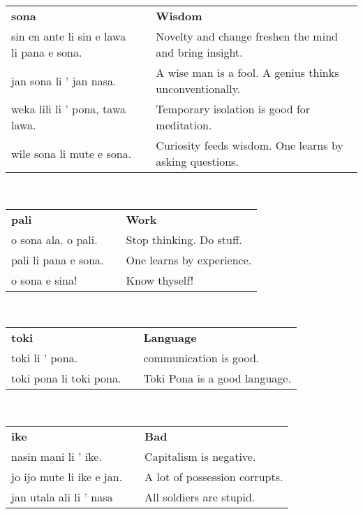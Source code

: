%
\begin{supertabular}{p{6cm}|ll}
    \textbf{sona}                             &  & \textbf{Wisdom}                                         \\
    sin en ante li sin e lawa li pana e sona. &  & Novelty and change freshen the mind and bring insight.  \\
    jan sona li ' jan nasa.                   &  & A wise man is a fool. A genius thinks unconventionally. \\
    weka lili li ' pona, tawa lawa.           &  & Temporary isolation is good for meditation.             \\
    wile sona li mute e sona.                 &  & Curiosity feeds wisdom. One learns by asking questions. \\
\end{supertabular} \\
%
\begin{supertabular}{p{6cm}|ll}
    \textbf{pali}        &  & \textbf{Work}             \\
    o sona ala. o pali.  &  & Stop thinking. Do stuff.  \\
    pali li pana e sona. &  & One learns by experience. \\
    o sona e sina!       &  & Know thyself!             \\
\end{supertabular} \\
%
\begin{supertabular}{p{6cm}|ll}
    \textbf{toki}           &  & \textbf{Language}             \\
    toki li ' pona.         &  & communication is good.        \\
    toki pona li toki pona. &  & Toki Pona is a good language. \\
\end{supertabular} \\
%
\begin{supertabular}{p{6cm}|ll}
    \textbf{ike}              &  & \textbf{Bad}                  \\
    nasin mani li ' ike.      &  & Capitalism is negative.       \\
    jo ijo mute li ike e jan. &  & A lot of possession corrupts. \\
    jan utala ali li ' nasa   &  & All soldiers are stupid.      \\
\end{supertabular} \\
